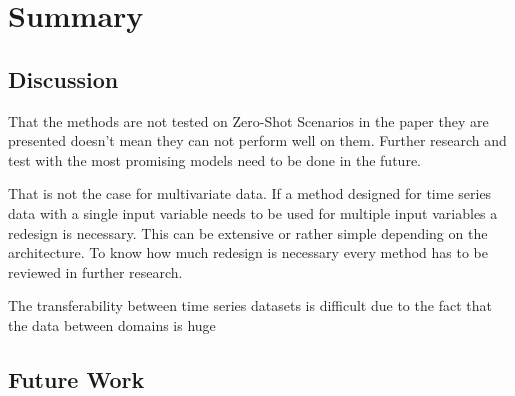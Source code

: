 \section{Summary}\label{discussion}
\subsection{Discussion} \label{discussion:auswertung}
That the methods are not tested on Zero-Shot Scenarios in the paper they are presented doesn't mean they can not perform well on them.  Further research and test with the most promising models need to be done in the future.

That is not the case for multivariate data. If a method designed for time series data with a single input variable needs to be used for multiple input variables a redesign is necessary. This can be extensive or rather simple depending on the architecture. To know how much redesign is necessary every method has to be reviewed in further research.


The transferability between time series datasets is difficult due to the fact that the data between domains is huge 

\subsection{Future Work} \label{discussion:ausblick}

